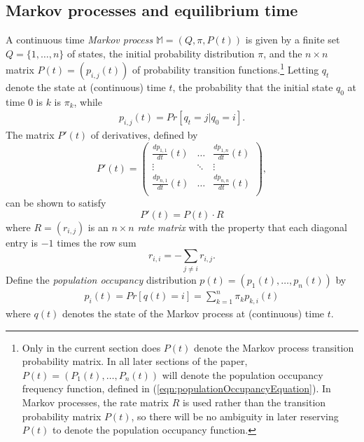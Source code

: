 \subsection{Markov processes and equilibrium time}



A continuous time {\em Markov process} $\mathbb{M}=(Q,\pi,P(t))$
is given by a finite set $Q= \{1,\ldots,n\}$ of states, the
initial probability distribution $\pi$,
and the $n\times n$ matrix $P(t)=(p_{i,j}(t))$ of
probability transition functions.\footnote{Only in the
current section does $P(t)$ denote the Markov process
transition probability matrix.  In all later sections of the paper,
$P(t) = (P_1(t),\ldots,P_n(t))$ will denote the population occupancy
frequency function, defined in (\ref{eqn:populationOccupancyEquation}).
In Markov processes, the rate matrix $R$ is used rather than the transition
probability matrix $P(t)$, so there will be no ambiguity in later
reserving $P(t)$ to denote the population occupancy function.}
Letting $q_t$ denote the state at (continuous)
time $t$, the probability that the initial state $q_0$ at time $0$ is
$k$ is $\pi_k$, while
\begin{eqnarray}
\label{eqn:MarkovProcess}
p_{i,j}(t) = Pr[q_{t} = j| q_0 = i] .
\end{eqnarray}
The matrix $P'(t)$ of derivatives, defined by
\begin{displaymath}
  P'(t) = \left(
\begin{array}{ccc}
\frac{d p_{1,1}}{d t}(t) & \ldots  & \frac{d p_{1,n}}{d t}(t)\\
\vdots & \ddots & \vdots\\
 \frac{d p_{n,1}}{d t}(t) & \ldots  & \frac{d p_{n,n}}{d t}(t)\\
\end{array}
\right),
\end{displaymath}
can be shown to satisfy
\begin{displaymath}
P'(t) = P(t) \cdot R
\end{displaymath}
where $R = (r_{i,j})$ is an $n \times n$ {\em rate matrix} with the
property that each diagonal entry is $-1$ times the row sum
\begin{displaymath}
r_{i,i} = - \sum_{j\ne i} r_{i,j}.
\end{displaymath}
Define the {\em population occupancy} distribution
$p(t) = (p_1(t),\ldots,p_n(t))$ by
\begin{eqnarray}
\label{eqn:markovProcessPopulationFreq}
p_i(t) = Pr[q(t) = i] = \sum_{k=1}^n\pi_k p_{k,i}(t)
\end{eqnarray}
where $q(t)$ denotes the state of the Markov process
at (continuous) time $t$.

